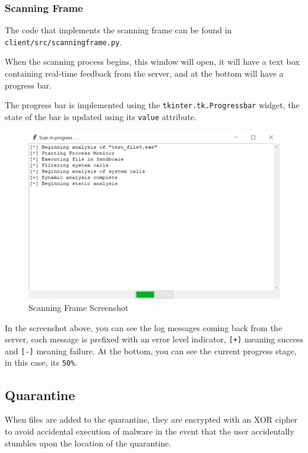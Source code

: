 \subsubsection{Scanning Frame}
The code that implements the scanning frame can
be found in \\
\texttt{client/src/scanningframe.py}.

When the scanning process begins, this window will open,
it will have a text box containing real-time feedback from the server,
and at the bottom will have a progress bar.

The progress bar is implemented using the \texttt{tkinter.tk.Progressbar} widget,
the state of the bar is updated using its \texttt{value} attribute. 

\begin{figure}[h!]
    \centering
    \label{image:scanningFrameScreenshot}
    \includegraphics[width=1\textwidth]{images/screenshots/scanning_frame}
    \caption{Scanning Frame Screenshot}
\end{figure}

In the screenshot above, you can see the log messages coming back from the server,
each message is prefixed with an error level indicator, \texttt{[+]} meaning success
and \texttt{[-]} meaning failure.
At the bottom, you can see the current progress stage,
in this case, its \texttt{50\%}.

\subsection{Quarantine}
When files are added to the quarantine,
they are encrypted with an XOR cipher to avoid accidental
execution of malware in the event that the user
accidentally stumbles upon the location of the quarantine.

